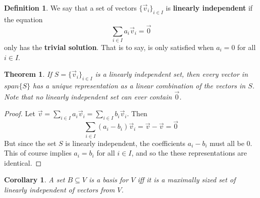 \documentclass{article}
\theoremstyle{definition}
\newtheorem{definition}{Definition}[section]
\theoremstyle{plain}
\theoremstyle{theorem}
\newtheorem{theorem}{Theorem}[section]
\newtheorem{corollary}{Corollary}[section]
\begin{document}
	\begin{definition}
		We say that a set of vectors $\{\vec{v}_i\}_{i \in I}$ is \textbf{linearly independent} if the equation
		\[ \sum_{i\in I} a_i\vec{v}_i = \vec{0} \]
	only has the \textbf{trivial solution}. That is to say, is only satisfied when $a_i=0$ for all $i \in I$.
	\end{definition} 
	\begin{theorem}
		If $S = \{\vec{v}_i\}_{i \in I}$ is a linearly independent set, then every vector in $span\{S\}$ has a unique representation as a linear combination of the vectors in $S$. Note that no linearly independent set can ever contain $\vec{0}$.
	\end{theorem}
	\begin{proof}
		Let $\vec{v} = \sum_{i\in I} a_i\vec{v}_i = \sum_{i \in I} b_i\vec{v}_i$. Then \[ \sum_{i \in I} (a_i-b_i)\vec{v}_i = \vec{v}-\vec{v} = \vec{0} \]
		But since the set $S$ is linearly independent, the coefficients $a_i-b_i$ must all be $0$. This of course implies $a_i=b_i$ for all $i\in I$, and so the these representations are identical. 
	\end{proof}
	\begin{corollary}
		A set $B \subseteq V$ is a basis for $V$ iff it is a maximally sized set of linearly independent of vectors from $V$.
	\end{corollary}
\end{document}
